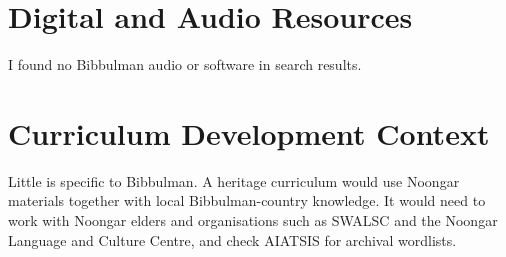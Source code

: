\documentclass[12pt]{article}
\begin{document}
\section{Digital and Audio Resources}
I found no Bibbulman audio or software in search results.

\section{Curriculum Development Context}
Little is specific to Bibbulman. A heritage curriculum would use Noongar materials together with local Bibbulman-country knowledge. It would need to work with Noongar elders and organisations such as SWALSC and the Noongar Language and Culture Centre, and check AIATSIS for archival wordlists.
\end{document}
